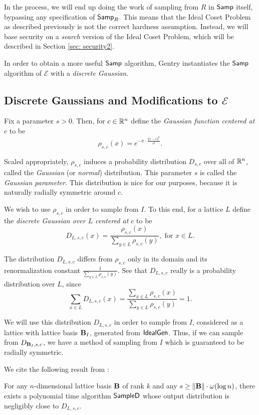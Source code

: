 In the process, we will end up doing the work of sampling from $R$ in ${\sf Samp}$ itself, bypassing any specification of ${\sf Samp}_R$. This means that the Ideal Coset Problem as described previously is not the correct hardness assumption. Instead, we will base security on a \emph{search} version of the Ideal Coset Problem, which will be described in Section \ref{sec: security2}.

In order to obtain a more useful ${\sf Samp}$ algorithm, Gentry instantiates the ${\sf Samp}$ algorithm of $\mathcal{E}$ with a \emph{discrete Gaussian}.

\subsection{Discrete Gaussians and Modifications to $\mathcal{E}$} \label{subsec: mods}

    Fix a parameter $s > 0$. Then, for $c \in \mathbb{R}^n$ define the \emph{Gaussian function centered at $c$} to be
    \[\rho_{s, c}(x) = e^{-\pi \cdot \frac{{\Vert x - c \Vert}^2}{s^2}}.\]

    Scaled appropriately, $\rho_{s,c}$ induces a probability distribution $D_{s,c}$ over all of $\mathbb{R}^n$, called the \emph{Gaussian} (or \emph{normal}) distribution. This parameter $s$ is called the \emph{Gaussian parameter}. This distribution is nice for our purposes, because it is naturally radially symmetric around $c$.

    We wish to use $\rho_{s,c}$ in order to sample from $I$. To this end, for a lattice $L$ define the \emph{discrete Gaussian over $L$ centered at $c$} to be
    \[D_{L, s, c}(x) = \frac{\rho_{s,c}(x)}{\sum_{y \in L} \rho_{s,c}(y)}, \text{ for $x \in L$.}\]

    The distribution $D_{L, s, c}$ differs from $\rho_{s, c}$ only in its domain and its renormalization constant $\frac{1}{\sum_{y \in L} \rho_{s,c}(y)}$. See that $D_{L, s, c}$ really is a probability distribution over $L$, since
    \[\sum_{x \in L} D_{L, s, c}(x) = \frac{\sum_{x \in L} \rho_{s,c}(x)}{\sum_{y \in L} \rho_{s,c}(y)} = 1.\]

    We will use this distribution $D_{L, s, c}$ in order to sample from $I$, considered as a lattice with lattice basis $\textbf{B}_I$, generated from ${\sf IdealGen}$. Thus, if we can sample from $D_{\textbf{B}_I, s, c}$, we have a method of sampling from $I$ which is guaranteed to be radially symmetric.

    We cite the following result from \cite{gpvgaussian}:
    \begin{lemma}
        For any $n$-dimensional lattice basis $\textbf{B}$ of rank $k$ and any $s \geq \Vert \textbf{B} \Vert \cdot \omega(\log n)$, there exists a polynomial time algorithm ${\sf SampleD}$ whose output distribution is negligibly close to $D_{L, s, c}$.
    \end{lemma}

